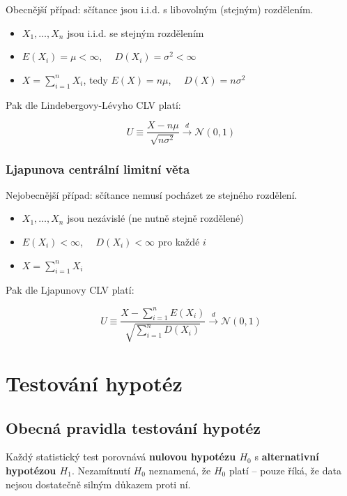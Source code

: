 \documentclass[a4paper, 11pt]{article}
\begin{document}
Obecnější případ: sčítance jsou i.i.d. s libovolným (stejným) rozdělením.

\begin{itemize}[noitemsep]
    \item $X_1, \ldots, X_n$ jsou i.i.d. se stejným rozdělením
    \item $E(X_i) = \mu < \infty$, $\quad D(X_i) = \sigma^2 < \infty$
    \item $X = \sum_{i=1}^{n} X_i$, tedy $E(X) = n\mu$, $\quad D(X) = n\sigma^2$
\end{itemize}

Pak dle Lindebergovy-Lévyho CLV platí:

\begin{equation*}
    U \equiv \frac{X - n\mu}{\sqrt{n\sigma^2}} \xrightarrow{d} \mathcal{N}(0,1)
\end{equation*}

\subsubsection{Ljapunova centrální limitní věta}

Nejobecnější případ: sčítance nemusí pocházet ze stejného rozdělení.

\begin{itemize}[noitemsep]
    \item $X_1, \ldots, X_n$ jsou nezávislé (ne nutně stejně rozdělené)
    \item $E(X_i) < \infty$, $\quad D(X_i) < \infty$ pro každé $i$
    \item $X = \sum_{i=1}^{n} X_i$
\end{itemize}

Pak dle Ljapunovy CLV platí:

\begin{equation*}
    U \equiv \frac{X - \sum_{i=1}^{n}E(X_i)}{\sqrt{\sum_{i=1}^{n}D(X_i)}}
    \xrightarrow{d} \mathcal{N}(0,1)
\end{equation*}


\clearpage
\section{Testování hypotéz}

\subsection{Obecná pravidla testování hypotéz}

Každý statistický test porovnává \textbf{nulovou hypotézu $H_0$} s \textbf{alternativní hypotézou $H_1$}.
Nezamítnutí $H_0$ neznamená, že $H_0$ platí -- pouze říká, že data nejsou dostatečně silným důkazem proti ní.
\end{document}
